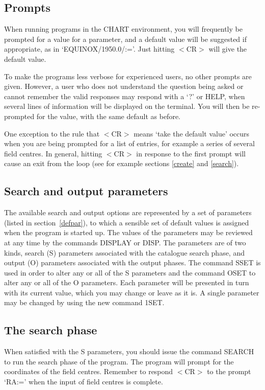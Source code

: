 \documentclass{article}
\begin{document}
\subsection{Prompts}
When running programs in the CHART environment, you will frequently be prompted
for a value for a parameter, and a default value will be suggested if
appropriate, as in `EQUINOX/1950.0/:='.
Just hitting $<$CR$>$ will give the default value.

To make the programs less verbose for experienced users, no other prompts are
given.
However, a user who does not understand the question being asked or cannot
remember the valid responses may respond with a `?' or HELP, when several lines
of information will be displayed on the terminal.
You will then be re-prompted for the value, with the same default as before.

One exception to the rule that $<$CR$>$ means `take the default value' occurs
when you are being prompted for a list of entries, for example a series of
several field centres. In general, hitting $<$CR$>$ in response to the first
prompt will cause an exit from the loop (see for example sections \ref{create}
and \ref{search}).

\subsection{Search and output parameters}
The available search and output options are represented by a set of parameters
(listed in section~\ref{defpar}), to which a sensible set of default values
is assigned when the program is started up.
The values of the parameters may be reviewed at any time by the commands DISPLAY
or DISP.
The parameters are of two kinds, search (S) parameters associated with the
catalogue search phase, and output (O) parameters associated with the output
phases.
The command SSET is used in order to alter any or all of the S parameters and
the command OSET to alter any or all of the O parameters.
Each parameter will be presented in turn with its current value, which you may
change or leave as it is.
A single parameter may be changed by using the new command 1SET.
\subsection{The search phase}
When satisfied with the S parameters, you should issue the command SEARCH to run
the search phase of the program.
The program will prompt for the coordinates of the field centres.
Remember to respond $<$CR$>$ to the prompt `RA:=' when the input of field
centres is complete.
\end{document}
